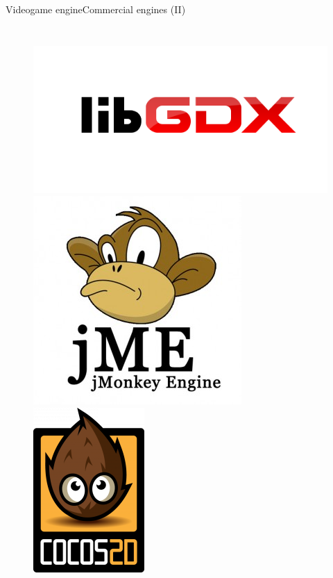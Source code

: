 \documentclass[10pt,compress]{beamer} %
\begin{document}
\begin{frame}{Videogame engine}{Commercial engines (II)}
	\vspace{-0.2cm}
    \begin{columns}
		\vspace{-0.5cm}
   	 	\begin{figure}[t]
		\begin{center}
		    \includegraphics[width=0.7\linewidth]{figs/libgdx}\\
		    \includegraphics[width=0.5\linewidth]{figs/jmonkey}
		    \includegraphics[width=0.45\linewidth]{figs/cocos2d1}\\

\end{center}
\end{figure}
\end{columns}
\end{frame}
\end{document}
